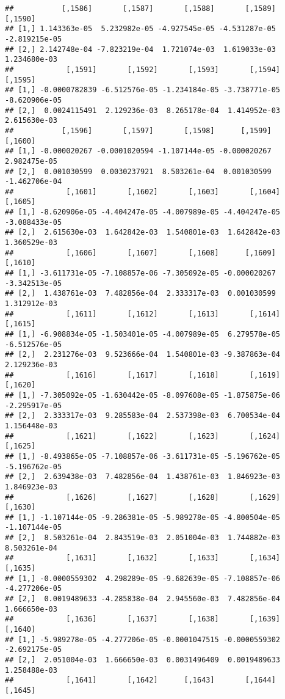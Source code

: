 \documentclass[
]{article}
\begin{document}
\begin{verbatim}
##           [,1586]       [,1587]       [,1588]       [,1589]       [,1590]
## [1,] 1.143363e-05  5.232982e-05 -4.927545e-05 -4.531287e-05 -2.819215e-05
## [2,] 2.142748e-04 -7.823219e-04  1.721074e-03  1.619033e-03  1.234680e-03
##            [,1591]       [,1592]       [,1593]       [,1594]       [,1595]
## [1,] -0.0000782839 -6.512576e-05 -1.234184e-05 -3.738771e-05 -8.620906e-05
## [2,]  0.0024115491  2.129236e-03  8.265178e-04  1.414952e-03  2.615630e-03
##           [,1596]       [,1597]       [,1598]      [,1599]       [,1600]
## [1,] -0.000020267 -0.0001020594 -1.107144e-05 -0.000020267  2.982475e-05
## [2,]  0.001030599  0.0030237921  8.503261e-04  0.001030599 -1.462706e-04
##            [,1601]       [,1602]       [,1603]       [,1604]       [,1605]
## [1,] -8.620906e-05 -4.404247e-05 -4.007989e-05 -4.404247e-05 -3.088433e-05
## [2,]  2.615630e-03  1.642842e-03  1.540801e-03  1.642842e-03  1.360529e-03
##            [,1606]       [,1607]       [,1608]      [,1609]       [,1610]
## [1,] -3.611731e-05 -7.108857e-06 -7.305092e-05 -0.000020267 -3.342513e-05
## [2,]  1.438761e-03  7.482856e-04  2.333317e-03  0.001030599  1.312912e-03
##            [,1611]       [,1612]       [,1613]       [,1614]       [,1615]
## [1,] -6.908834e-05 -1.503401e-05 -4.007989e-05  6.279578e-05 -6.512576e-05
## [2,]  2.231276e-03  9.523666e-04  1.540801e-03 -9.387863e-04  2.129236e-03
##            [,1616]       [,1617]       [,1618]       [,1619]       [,1620]
## [1,] -7.305092e-05 -1.630442e-05 -8.097608e-05 -1.875875e-06 -2.295917e-05
## [2,]  2.333317e-03  9.285583e-04  2.537398e-03  6.700534e-04  1.156448e-03
##            [,1621]       [,1622]       [,1623]       [,1624]       [,1625]
## [1,] -8.493865e-05 -7.108857e-06 -3.611731e-05 -5.196762e-05 -5.196762e-05
## [2,]  2.639438e-03  7.482856e-04  1.438761e-03  1.846923e-03  1.846923e-03
##            [,1626]       [,1627]       [,1628]       [,1629]       [,1630]
## [1,] -1.107144e-05 -9.286381e-05 -5.989278e-05 -4.800504e-05 -1.107144e-05
## [2,]  8.503261e-04  2.843519e-03  2.051004e-03  1.744882e-03  8.503261e-04
##            [,1631]       [,1632]       [,1633]       [,1634]       [,1635]
## [1,] -0.0000559302  4.298289e-05 -9.682639e-05 -7.108857e-06 -4.277206e-05
## [2,]  0.0019489633 -4.285838e-04  2.945560e-03  7.482856e-04  1.666650e-03
##            [,1636]       [,1637]       [,1638]       [,1639]       [,1640]
## [1,] -5.989278e-05 -4.277206e-05 -0.0001047515 -0.0000559302 -2.692175e-05
## [2,]  2.051004e-03  1.666650e-03  0.0031496409  0.0019489633  1.258488e-03
##            [,1641]       [,1642]      [,1643]       [,1644]       [,1645]

\end{verbatim}
\end{document}
